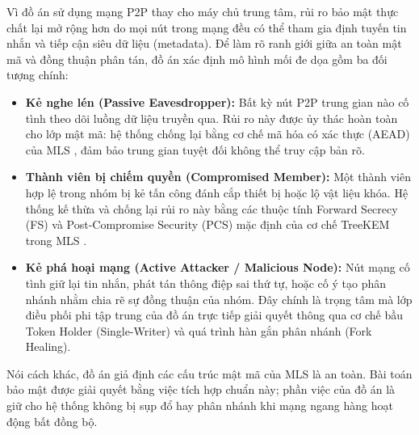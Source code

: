 \documentclass[../DoAn.tex]{subfiles}
\begin{document}
Vì đồ án sử dụng mạng P2P thay cho máy chủ trung tâm, rủi ro bảo mật thực chất lại mở rộng hơn do mọi nút trong mạng đều có thể tham gia định tuyến tin nhắn và tiếp cận siêu dữ liệu (metadata). Để làm rõ ranh giới giữa an toàn mật mã và đồng thuận phân tán, đồ án xác định mô hình mối đe dọa gồm ba đối tượng chính:

\begin{itemize}
    \item \textbf{Kẻ nghe lén (Passive Eavesdropper):} Bất kỳ nút P2P trung gian nào cố tình theo dõi luồng dữ liệu truyền qua. Rủi ro này được ủy thác hoàn toàn cho lớp mật mã: hệ thống chống lại bằng cơ chế mã hóa có xác thực (AEAD) của MLS \cite{rfc5116}, đảm bảo trung gian tuyệt đối không thể truy cập bản rõ.
    \item \textbf{Thành viên bị chiếm quyền (Compromised Member):} Một thành viên hợp lệ trong nhóm bị kẻ tấn công đánh cắp thiết bị hoặc lộ vật liệu khóa. Hệ thống kế thừa và chống lại rủi ro này bằng các thuộc tính Forward Secrecy (FS) và Post-Compromise Security (PCS) mặc định của cơ chế TreeKEM trong MLS \cite{rfc9420}.
    \item \textbf{Kẻ phá hoại mạng (Active Attacker / Malicious Node):} Nút mạng cố tình giữ lại tin nhắn, phát tán thông điệp sai thứ tự, hoặc cố ý tạo phân nhánh nhằm chia rẽ sự đồng thuận của nhóm. Đây chính là trọng tâm mà lớp điều phối phi tập trung của đồ án trực tiếp giải quyết thông qua cơ chế bầu Token Holder (Single-Writer) và quá trình hàn gắn phân nhánh (Fork Healing).
\end{itemize}

Nói cách khác, đồ án giả định các cấu trúc mật mã của MLS là an toàn. Bài toán bảo mật được giải quyết bằng việc tích hợp chuẩn này; phần việc của đồ án là giữ cho hệ thống không bị sụp đổ hay phân nhánh khi mạng ngang hàng hoạt động bất đồng bộ.
\end{document}
